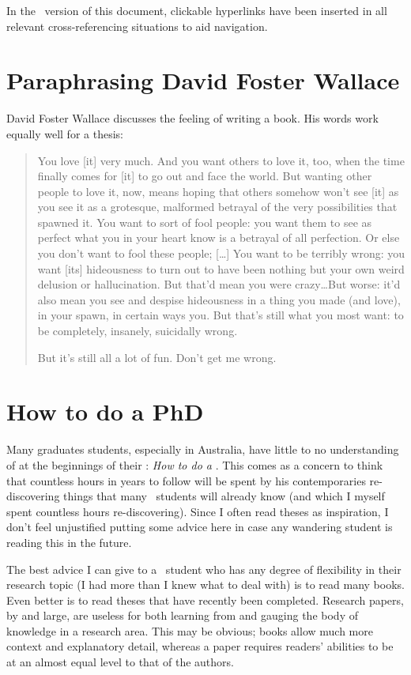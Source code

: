 In the \PDF\ version of this document, clickable hyperlinks have been inserted
in all relevant cross-referencing situations to aid navigation.




\section{Paraphrasing David Foster Wallace}

David Foster Wallace discusses the feeling of writing a book.
His words work equally well for a thesis:

\begin{quotation}
You love [it] very much. And you want others to love it, too, when the time
finally comes for [it] to go out and face the world. But wanting other people
to love it, now, means hoping that others somehow won't see [it] as you see it
\dash as a grotesque, malformed betrayal of the very possibilities that
spawned it. You want to sort of fool people: you want them to see as perfect
what you in your heart know is a betrayal of all perfection. Or else you don't
want to fool these people; [\dots] You want to be terribly wrong: you want [its]
hideousness to turn out to have been nothing but your own weird delusion or
hallucination. But that'd mean you were crazy\dots But worse: it'd also mean
you see and despise hideousness in a thing you made (and love), in your spawn,
in certain ways you. But that's still what you most want: to be completely,
insanely, suicidally wrong.

But it's still all a lot of fun. Don't get me wrong.
\end{quotation}

\section{How to do a PhD}

Many graduates students, especially in Australia, have little to no
understanding of at the beginnings of their \PhD: \emph{How to do a
  \PhD}. This comes as a concern to think that countless
hours in years to follow will be spent by his contemporaries
re-discovering things that many \PhD\ students will already know (and
which I myself spent countless hours re-discovering). Since I often
read theses as inspiration, I don't feel unjustified putting some advice here
in case any wandering student is reading this in the future.

The best advice I can give to a \PhD\ student who has any degree of
flexibility in their research topic (I had more than I knew what to
deal with) is to read many books. Even better is to read theses that
have recently been completed. Research papers, by and large, are
useless for both learning from and gauging the body of knowledge in a
research area. This may be obvious; books allow much more context and
explanatory detail, whereas a paper requires readers' abilities to be
at an almost equal level to that of the authors.
